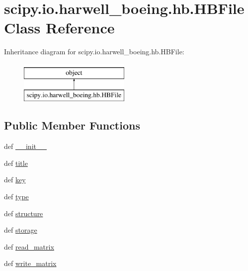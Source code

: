\hypertarget{classscipy_1_1io_1_1harwell__boeing_1_1hb_1_1HBFile}{}\section{scipy.\+io.\+harwell\+\_\+boeing.\+hb.\+H\+B\+File Class Reference}
\label{classscipy_1_1io_1_1harwell__boeing_1_1hb_1_1HBFile}
Inheritance diagram for scipy.\+io.\+harwell\+\_\+boeing.\+hb.\+H\+B\+File\+:\begin{figure}[H]
\begin{center}
\leavevmode
\includegraphics[height=2.000000cm]{classscipy_1_1io_1_1harwell__boeing_1_1hb_1_1HBFile}
\end{center}
\end{figure}
\subsection*{Public Member Functions}
\begin{DoxyCompactItemize}
\item 
def \hyperlink{classscipy_1_1io_1_1harwell__boeing_1_1hb_1_1HBFile_a27824957aa19ab878d1ca0d0a998b96b}{\+\_\+\+\_\+init\+\_\+\+\_\+}
\item 
def \hyperlink{classscipy_1_1io_1_1harwell__boeing_1_1hb_1_1HBFile_a9d4283d0839f85843f7aa85dc35878f2}{title}
\item 
def \hyperlink{classscipy_1_1io_1_1harwell__boeing_1_1hb_1_1HBFile_a3f2ad18929f46fbbb5ca4418e36ef46d}{key}
\item 
def \hyperlink{classscipy_1_1io_1_1harwell__boeing_1_1hb_1_1HBFile_a8dd53815f1d71e2367e5f0b07c41d437}{type}
\item 
def \hyperlink{classscipy_1_1io_1_1harwell__boeing_1_1hb_1_1HBFile_ad85bcc67e19d48a77bf1a641a349de1d}{structure}
\item 
def \hyperlink{classscipy_1_1io_1_1harwell__boeing_1_1hb_1_1HBFile_af00beccab718694ce1c3944b2f59b0b6}{storage}
\item 
def \hyperlink{classscipy_1_1io_1_1harwell__boeing_1_1hb_1_1HBFile_aa524bccb1618a77d08f6bc4773a62950}{read\+\_\+matrix}
\item 
def \hyperlink{classscipy_1_1io_1_1harwell__boeing_1_1hb_1_1HBFile_a29db7767d0659e8a7f8976848fd0720e}{write\+\_\+matrix}
\end{DoxyCompactItemize}


